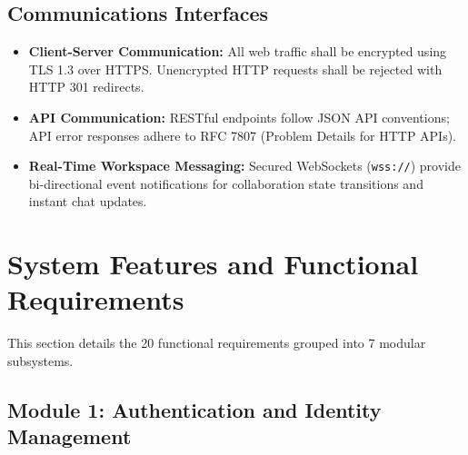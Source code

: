 \documentclass[11pt,a4paper]{article}
\begin{document}
\subsection{Communications Interfaces}
\begin{itemize}[noitemsep]
    \item \textbf{Client-Server Communication:} All web traffic shall be encrypted using TLS 1.3 over HTTPS. Unencrypted HTTP requests shall be rejected with HTTP 301 redirects.
    \item \textbf{API Communication:} RESTful endpoints follow JSON API conventions; API error responses adhere to RFC 7807 (Problem Details for HTTP APIs).
    \item \textbf{Real-Time Workspace Messaging:} Secured WebSockets (\texttt{wss://}) provide bi-directional event notifications for collaboration state transitions and instant chat updates.
\end{itemize}

\clearpage
\section{System Features and Functional Requirements}
\label{sec:functional_reqs}

This section details the 20 functional requirements grouped into 7 modular subsystems.

\subsection{Module 1: Authentication and Identity Management}
\end{document}
